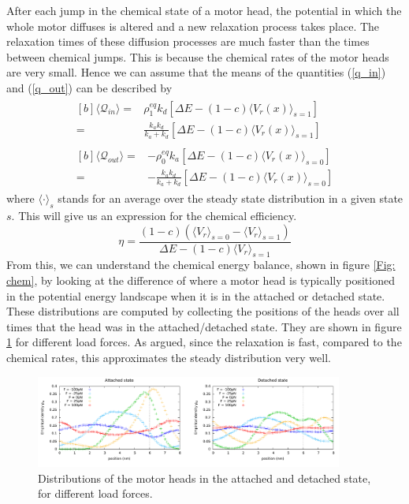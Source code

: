 \documentclass[aps,pre,twocolumn,showpacs,showkeys,a4paper]{revtex4}
\begin{document}
After each jump in the chemical state of a motor head, the potential in which the whole motor diffuses is altered and a new relaxation process takes place. 
The relaxation times of these diffusion processes are much faster than the times between chemical jumps. 
This is because the chemical rates of the motor heads are very small. 
Hence we can assume that the means of the quantities (\ref{q_in}) and (\ref{q_out}) can be described by
\begin{gather}
\begin{aligned}[b]
\langle \mathcal Q_{in} \rangle 
=& \rho^{eq}_1 k_d \left[ \Delta E - (1-c)\langle V_r(x) \rangle_{s=1} \right] \\
=& \frac{k_a k_d}{k_a + k_d}\left[\Delta E - (1-c)\langle V_r(x) \rangle_{s=1} \right] 
\end{aligned}
\label{Q_in} \\
\begin{aligned}[b]
\langle \mathcal Q_{out} \rangle 
=& -\rho^{eq}_0 k_a \left[ \Delta E - (1-c)\langle V_r(x) \rangle_{s=0} \right] \\
=& -\frac{k_a k_d}{k_a + k_d} \left[ \Delta E - (1-c)\langle V_r(x) \rangle_{s=0} \right] 
\end{aligned}
\label{Q_out}
\end{gather}
where $\langle \cdot \rangle_{s}$ stands for an average over the steady state distribution in a given state $s$. 
This will give us an expression for the chemical efficiency.
\begin{equation}
\eta = \frac{ (1-c) \left( \langle V_r \rangle_{s=0} - \langle V_r \rangle_{s=1} \right) }{ \Delta E - (1-c) \langle V_r \rangle_{s=1} } \label{eta}
\end{equation}
From this, we can understand the chemical energy balance, shown in figure \ref{Fig: chem}, by looking at the difference of where a motor head is typically positioned in the potential energy landscape when it is in the attached or detached state. 
These distributions are computed by collecting the positions of the heads over all times that the head was in the attached/detached state. 
They are shown in figure \ref{Fig: pos_distr} for different load forces. 
As argued, since the relaxation is fast, compared to the chemical rates, this approximates the steady distribution very well.
\begin{figure}[t]
\centering
\includegraphics[width=0.9\textwidth,height=!]{pos_distr_all_F}
\caption{Distributions of the motor heads in the attached and detached state, for different load forces.}
\label{Fig: pos_distr}
\end{figure}
\end{document}
